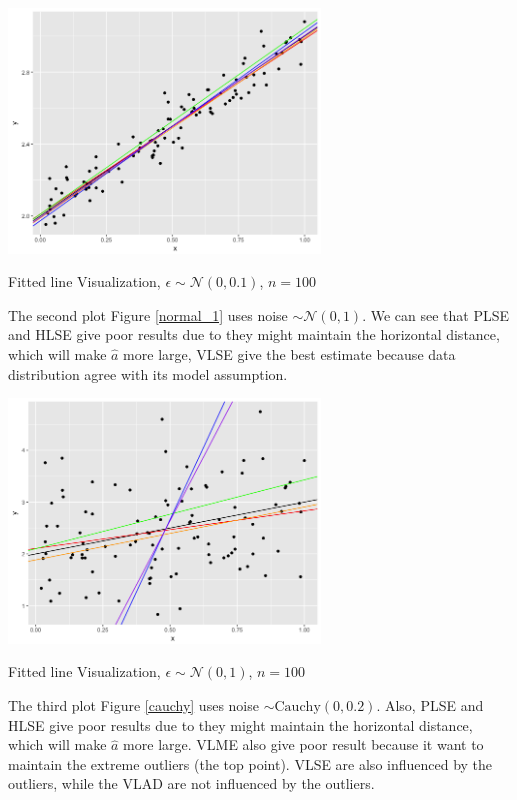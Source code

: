 \documentclass[twoside]{article}
\begin{document}
\begin{center}
\makeatletter
\def\@captype{figure}
\makeatother
\includegraphics [height=6.5cm]{code/sca/sca+normal_0.1.png}
\caption{Fitted line Visualization, $\epsilon \sim \mathcal{N}(0,0.1)$, $n=100$}
\label{normal_0.1}
\end{center}

The second plot  Figure \ref{normal_1} uses noise $\sim \mathcal{N}(0,1)$. We can see that PLSE and HLSE give poor results due to they might maintain
 the horizontal distance, which will make $\hat{a}$ more large, VLSE give the best estimate because data distribution agree with its model assumption.

\begin{center}
\makeatletter
\def\@captype{figure}
\makeatother
\includegraphics [height=6.5cm]{code/sca/sca+normal_1.png}
\caption{Fitted line Visualization, $\epsilon \sim \mathcal{N}(0,1)$, $n=100$}
\label{normal_1}
\end{center}

The third plot Figure \ref{cauchy} uses noise $\sim \mathrm{Cauchy}(0,0.2)$. Also, PLSE and HLSE give poor results due to they might maintain the horizontal distance, which will make $\hat{a}$ more large. VLME also give poor result because it want to maintain the extreme outliers (the top point). VLSE are also influenced by the outliers, while the VLAD are not influenced by the outliers.
\end{document}
